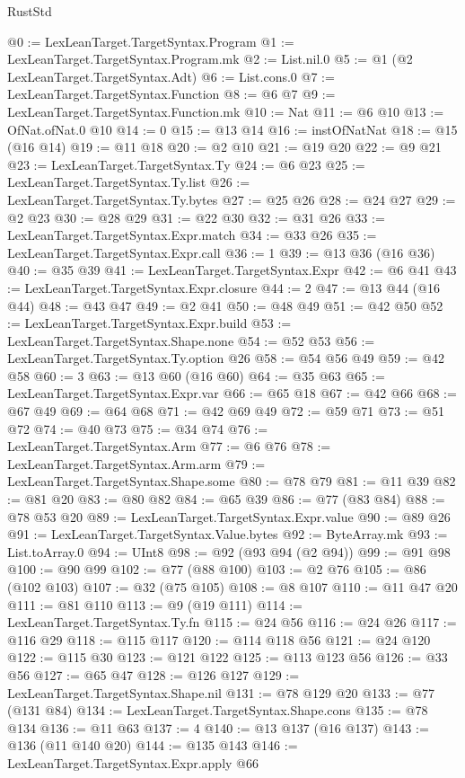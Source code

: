 \begin{lexlean}{RustStd}
\begin{coremodule}
{\begin{coremodule}
{{{{{{{{{{{{{@0 := LexLeanTarget.TargetSyntax.Program
@1 := LexLeanTarget.TargetSyntax.Program.mk
@2 := List.nil.{0}
@5 := @1 (@2 LexLeanTarget.TargetSyntax.Adt)
@6 := List.cons.{0}
@7 := LexLeanTarget.TargetSyntax.Function
@8 := @6 @7
@9 := LexLeanTarget.TargetSyntax.Function.mk
@10 := Nat
@11 := @6 @10
@13 := OfNat.ofNat.{0} @10
@14 := 0
@15 := @13 @14
@16 := instOfNatNat
@18 := @15 (@16 @14)
@19 := @11 @18
@20 := @2 @10
@21 := @19 @20
@22 := @9 @21
@23 := LexLeanTarget.TargetSyntax.Ty
@24 := @6 @23
@25 := LexLeanTarget.TargetSyntax.Ty.list
@26 := LexLeanTarget.TargetSyntax.Ty.bytes
@27 := @25 @26
@28 := @24 @27
@29 := @2 @23
@30 := @28 @29
@31 := @22 @30
@32 := @31 @26
@33 := LexLeanTarget.TargetSyntax.Expr.match
@34 := @33 @26
@35 := LexLeanTarget.TargetSyntax.Expr.call
@36 := 1
@39 := @13 @36 (@16 @36)
@40 := @35 @39
@41 := LexLeanTarget.TargetSyntax.Expr
@42 := @6 @41
@43 := LexLeanTarget.TargetSyntax.Expr.closure
@44 := 2
@47 := @13 @44 (@16 @44)
@48 := @43 @47
@49 := @2 @41
@50 := @48 @49
@51 := @42 @50
@52 := LexLeanTarget.TargetSyntax.Expr.build
@53 := LexLeanTarget.TargetSyntax.Shape.none
@54 := @52 @53
@56 := LexLeanTarget.TargetSyntax.Ty.option @26
@58 := @54 @56 @49
@59 := @42 @58
@60 := 3
@63 := @13 @60 (@16 @60)
@64 := @35 @63
@65 := LexLeanTarget.TargetSyntax.Expr.var
@66 := @65 @18
@67 := @42 @66
@68 := @67 @49
@69 := @64 @68
@71 := @42 @69 @49
@72 := @59 @71
@73 := @51 @72
@74 := @40 @73
@75 := @34 @74
@76 := LexLeanTarget.TargetSyntax.Arm
@77 := @6 @76
@78 := LexLeanTarget.TargetSyntax.Arm.arm
@79 := LexLeanTarget.TargetSyntax.Shape.some
@80 := @78 @79
@81 := @11 @39
@82 := @81 @20
@83 := @80 @82
@84 := @65 @39
@86 := @77 (@83 @84)
@88 := @78 @53 @20
@89 := LexLeanTarget.TargetSyntax.Expr.value
@90 := @89 @26
@91 := LexLeanTarget.TargetSyntax.Value.bytes
@92 := ByteArray.mk
@93 := List.toArray.{0}
@94 := UInt8
@98 := @92 (@93 @94 (@2 @94))
@99 := @91 @98
@100 := @90 @99
@102 := @77 (@88 @100)
@103 := @2 @76
@105 := @86 (@102 @103)
@107 := @32 (@75 @105)
@108 := @8 @107
@110 := @11 @47 @20
@111 := @81 @110
@113 := @9 (@19 @111)
@114 := LexLeanTarget.TargetSyntax.Ty.fn
@115 := @24 @56
@116 := @24 @26
@117 := @116 @29
@118 := @115 @117
@120 := @114 @118 @56
@121 := @24 @120
@122 := @115 @30
@123 := @121 @122
@125 := @113 @123 @56
@126 := @33 @56
@127 := @65 @47
@128 := @126 @127
@129 := LexLeanTarget.TargetSyntax.Shape.nil
@131 := @78 @129 @20
@133 := @77 (@131 @84)
@134 := LexLeanTarget.TargetSyntax.Shape.cons
@135 := @78 @134
@136 := @11 @63
@137 := 4
@140 := @13 @137 (@16 @137)
@143 := @136 (@11 @140 @20)
@144 := @135 @143
@146 := LexLeanTarget.TargetSyntax.Expr.apply @66
}}}}}}}}}}}}}
\end{coremodule}}
\end{coremodule}
\end{lexlean}
